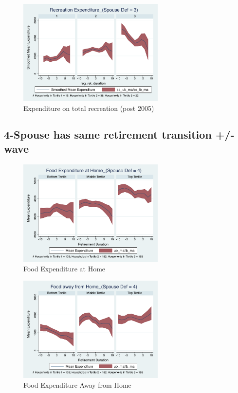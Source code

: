 \documentclass[11pt,onecolumn]{article}
\numberwithin{figure}{section}
\begin{document}
\begin{figure}[h]
	\caption{Expenditure on total recreation (post 2005)}
	\centering
	\includegraphics[width=0.65\textwidth]{../ConsumptionPostRetirement_by_SpouseDef_Cats/Smoothed/3/spouse_def_total_recreation_2005_real.pdf}
\end{figure}

\clearpage

\subsection{4-Spouse has same retirement transition +/- wave}

\begin{figure}[h]
	\caption{Food Expenditure at Home}
	\centering
	\includegraphics[width=0.65\textwidth]{../ConsumptionPostRetirement_by_SpouseDef_Cats/Smoothed/4/spouse_def_total_foodexp_home_real.pdf}
\end{figure}


\begin{figure}[h]
	\caption{Food Expenditure Away from Home}
	\centering
	\includegraphics[width=0.65\textwidth]{../ConsumptionPostRetirement_by_SpouseDef_Cats/Smoothed/4/spouse_def_total_foodexp_away_real.pdf}
\end{figure}
\end{document}
